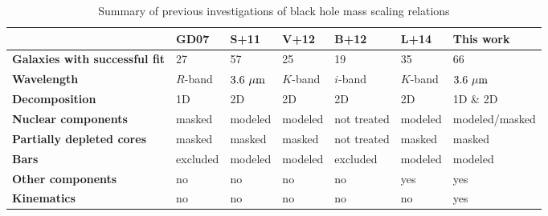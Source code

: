 \documentclass[preprint2]{emulateapj}
\begin{document}
\begin{table}%
\begin{center}  				      
\caption{Summary of previous investigations of black hole mass scaling relations} 
\begin{tabular}{lllllll}
\hline
              & {\bf GD07}  & {\bf S+11}   & {\bf V+12} & {\bf B+12}   & {\bf L+14} & {\bf This work}	      \\ %
\hline
{\bf Galaxies with successful fit} & 27		     & 57	       & 25      & 19          & 35      & 66               \\
{\bf Wavelength}        	   & $R$-band	     & $3.6~\rm \mu m$ & $K$-band& $i$-band    & $K$-band& $3.6~\rm \mu m$  \\
{\bf Decomposition}     	   & 1D 	     & 2D	       & 2D	 & 2D	       & 2D	 & 1D \& 2D	    \\
{\bf Nuclear components}       	   & masked	     & modeled         & modeled & not treated & modeled & modeled/masked   \\
{\bf Partially depleted cores} 	   & masked	     & masked	       & masked  & not treated & masked  & masked	    \\ 
{\bf Bars}	        	   & excluded	     & modeled         & modeled & excluded    & modeled & modeled	    \\ 
{\bf Other components}  	   & no 	     & no 	       & no	 & no	       & yes	 & yes  	    \\ 
{\bf Kinematics}        	   & no 	     & no	       & no	 & no	       & no	 & yes  	    \\ %
\hline 
\end{tabular}
\label{tab:lit} 
\end{center}	
\end{table}
\end{document}
